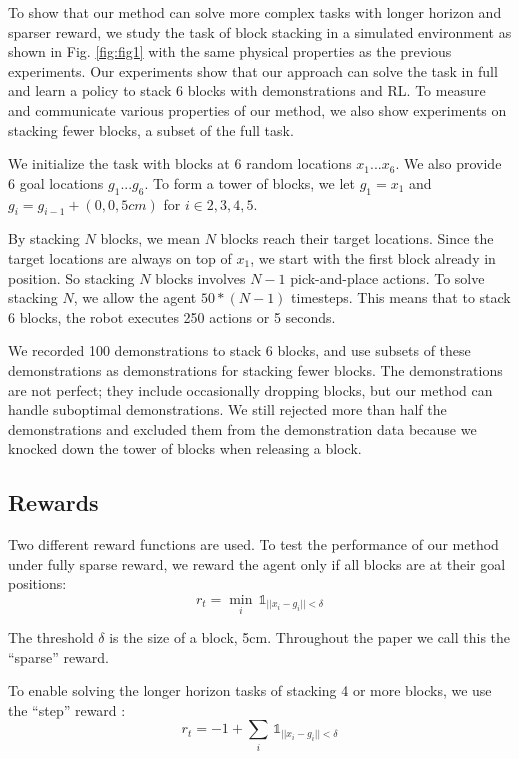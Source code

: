 \documentclass[letterpaper, 10 pt, conference]{ieeeconf}  %
\begin{document}
To show that our method can solve more complex tasks with longer horizon and sparser reward, we study %
the task of block stacking in a simulated  environment as shown in Fig. \ref{fig:fig1} with the same physical properties as the previous experiments. Our experiments show that our approach can solve the task in full and learn a policy to stack 6 blocks with demonstrations and RL.  To measure and communicate various properties of our method, we also show experiments on stacking fewer blocks, a subset of the full task.

We initialize the task with blocks at 6 random locations $x_1 ... x_6$. We also provide 6 goal locations $g_1 ... g_6$. To form a tower of blocks, we let $g_1 = x_1$ and $g_i = g_{i-1} + (0, 0, 5cm)$ for $i \in 2, 3, 4, 5$.

By stacking $N$ blocks, we mean $N$ blocks reach their target locations. Since the target locations are always on top of $x_1$, we start with the first block already in position. So stacking $N$ blocks involves $N-1$ pick-and-place actions. To solve stacking $N$, we allow the agent $50 * (N-1)$ timesteps. This means that to stack 6 blocks, the robot executes 250 actions or 5 seconds.

We recorded 100 demonstrations to stack 6 blocks, and use subsets of these demonstrations as demonstrations for stacking fewer blocks. The demonstrations are not perfect; they include occasionally dropping blocks, but our method can handle suboptimal demonstrations. We still rejected more than half the demonstrations and excluded them from the demonstration data because we knocked down the tower of blocks when releasing a block.

\subsection{Rewards}

Two different reward functions are used. To test the performance of our method under fully sparse reward, we reward the agent only if all blocks are at their goal positions:
\begin{equation}
    r_t = \min_i \, \mathds{1}_{||x_i - g_i|| < \delta}
\end{equation}

\noindent The threshold $\delta$ is the size of a block, 5cm. Throughout the paper we call this the ``sparse'' reward.

To enable solving the longer horizon tasks of stacking 4 or more blocks, we use the ``step'' reward :
\begin{equation}
    r_t = -1 + \sum_i \, \mathds{1}_{||x_i - g_i|| < \delta}
\end{equation}
\end{document}
